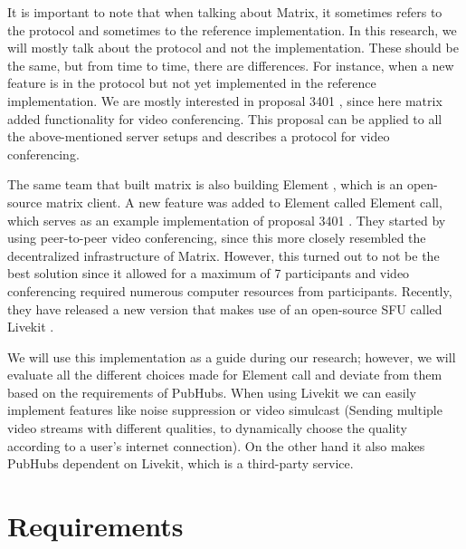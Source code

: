 \documentclass{report}
\begin{document}
It is important to note that when talking about Matrix, it sometimes refers to the protocol and sometimes to the
reference implementation. In this research, we will mostly talk about the protocol and not the implementation. These
should be the same, but from time to time, there are differences. For instance, when a new feature is in the protocol
but not yet implemented in the reference implementation. We are mostly interested in proposal 3401 \cite{
noauthor_matrix-spec-proposalsproposals3401-group-voipmd_nodate}, since here matrix added functionality for video conferencing. This proposal
can be applied to all the above-mentioned server setups and describes a protocol for video conferencing.

The same team that built matrix is also building Element \cite{noauthor_element_nodate}, which is an open-source matrix client.
A new feature was added to Element called Element call, which serves as an example implementation of proposal
3401 \cite{noauthor_matrix-spec-proposalsproposals3401-group-voipmd_nodate}. They started by using peer-to-peer video conferencing, since this more closely resembled the
decentralized infrastructure of Matrix. However, this turned out to not be the best solution since it allowed for a
maximum of 7 participants and video conferencing required numerous computer  resources from participants. Recently,
they have released a new version that makes use of an open-source SFU called Livekit \cite{noauthor_livekit_nodate}.

We will use this implementation as a guide during our research; however, we will evaluate all the different choices
made for Element call and deviate from them based on the requirements of PubHubs. When using Livekit we can easily
implement features like noise suppression or video simulcast (Sending multiple video streams with different
qualities, to dynamically choose the quality according to a user's internet connection). On the other hand it
also makes PubHubs dependent on Livekit, which is a third-party service.


\chapter{Requirements}
\end{document}
